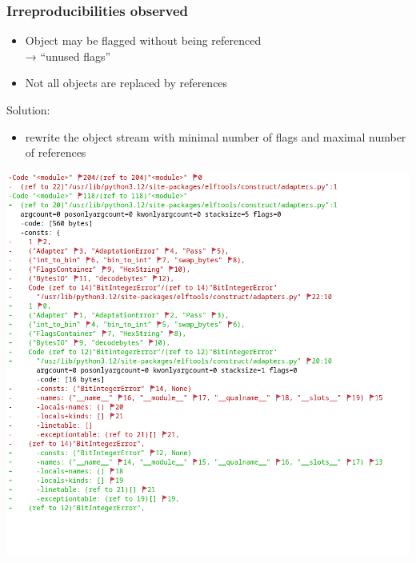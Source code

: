 \documentclass[]{beamer}
\begin{document}
\begin{frame}
  \frametitle{Irreproducibilities observed}

  \begin{itemize}
    \pause
  \item Object may be flagged without being referenced\\
    → ``unused flags''
    \pause
  \item Not all objects are replaced by references
  \end{itemize}

  \vfill
  \pause

  Solution:\\\pause
  \begin{itemize}
  \item rewrite the object stream with minimal number of flags and maximal number of references
  \end{itemize}
\end{frame}

\begin{frame}
  \includegraphics[width=\textwidth]{images/pyc-diff.png}
\end{frame}
\end{document}
